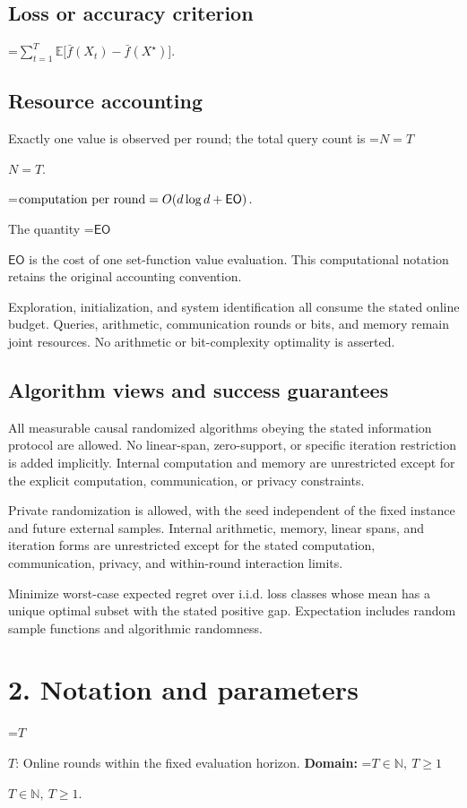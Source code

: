 \documentclass[10pt,a4paper]{article}
\newcommand{\AtlasMath}[1]{\par\begingroup\centering\setbox0=\hbox{$\displaystyle #1$}\ifdim\wd0>1.4\linewidth\typeout{ATLAS WIDE FORMULA: \the\wd0}\fi\ifdim\wd0>\linewidth\resizebox{\linewidth}{!}{\box0}\else\box0\fi\par\endgroup}
\newcommand{\AtlasInlineMath}[1]{\begingroup\setbox0=\hbox{$#1$}\ifdim\wd0>.4\linewidth\endgroup\AtlasMath{#1}\else\endgroup$#1$\fi}
\begin{document}
\subsection{Loss or accuracy criterion}

\AtlasMath{\sum_{t=1}^{T}\mathbb{E}\bigl[\bar f(X_t)-\bar f(X^\star)\bigr].}


\subsection{Resource accounting}
Exactly one value is observed per round; the total query count is \AtlasInlineMath{N=T}.


\AtlasMath{\text{\text{computation per round}}=O\!\left(d\log d+\mathsf{EO}\right).}


The quantity \AtlasInlineMath{\mathsf{EO}} is the cost of one set-function value evaluation. This computational notation retains the original accounting convention.

Exploration, initialization, and system identification all consume the stated online budget. Queries, arithmetic, communication rounds or bits, and memory remain joint resources. No arithmetic or bit-complexity optimality is asserted.

\subsection{Algorithm views and success guarantees}
All measurable causal randomized algorithms obeying the stated information protocol are allowed. No linear-span, zero-support, or specific iteration restriction is added implicitly. Internal computation and memory are unrestricted except for the explicit computation, communication, or privacy constraints.

Private randomization is allowed, with the seed independent of the fixed instance and future external samples. Internal arithmetic, memory, linear spans, and iteration forms are unrestricted except for the stated computation, communication, privacy, and within-round interaction limits.

Minimize worst-case expected regret over i.i.d. loss classes whose mean has a unique optimal subset with the stated positive gap. Expectation includes random sample functions and algorithmic randomness.

\section{2. Notation and parameters}
\AtlasInlineMath{T}: Online rounds within the fixed evaluation horizon. \textbf{Domain:} \AtlasInlineMath{T\in\mathbb N,\ T\ge1}.
\end{document}
